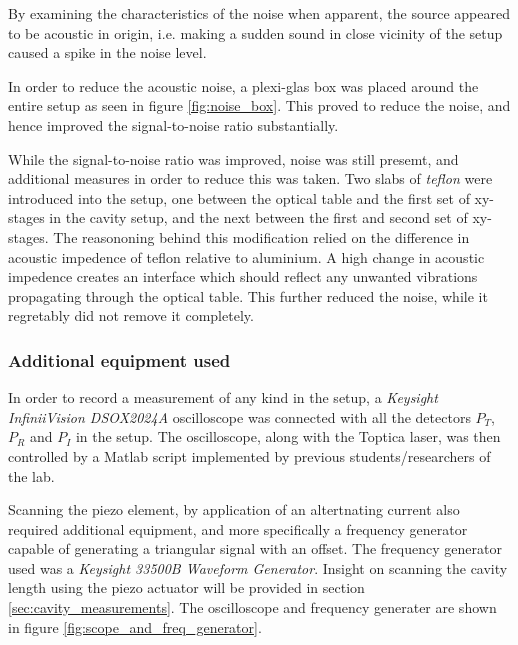 By examining the characteristics of the noise when apparent, the source appeared to be acoustic in origin, i.e. making a sudden sound in close vicinity of the setup caused a spike in the noise level.

In order to reduce the acoustic noise, a plexi-glas box was placed around the entire setup as seen in figure \ref{fig:noise_box}. This proved to reduce the noise, and hence improved the signal-to-noise ratio substantially.

While the signal-to-noise ratio was improved, noise was still presemt, and additional measures in order to reduce this was taken. Two slabs of \emph{teflon} were introduced into the setup, one between the optical table and the first set of xy-stages in the cavity setup, and the next between the first and second set of xy-stages. The reasononing behind this modification relied on the difference in acoustic impedence of teflon relative to aluminium. A high change in acoustic impedence creates an interface which should reflect any unwanted vibrations propagating through the optical table. This further reduced the noise, while it regretably did not remove it completely. 

\subsubsection{Additional equipment used}

In order to record a measurement of any kind in the setup, a \emph{Keysight InfiniiVision DSOX2024A}\cite{oscilloscope} oscilloscope was connected with all the detectors $P_T$, $P_R$ and $P_I$ in the setup. The oscilloscope, along with the Toptica laser, was then controlled by a Matlab script implemented by previous students/researchers of the lab. 

Scanning the piezo element, by application of an altertnating current also required additional equipment, and more specifically a frequency generator capable of generating a triangular signal with an offset. The frequency generator used was a \emph{Keysight 33500B Waveform Generator}\cite{frequency_generator}. Insight on scanning the cavity length using the piezo actuator will be provided in section \ref{sec:cavity_measurements}. The oscilloscope and frequency generater are shown in figure \ref{fig:scope_and_freq_generator}.

